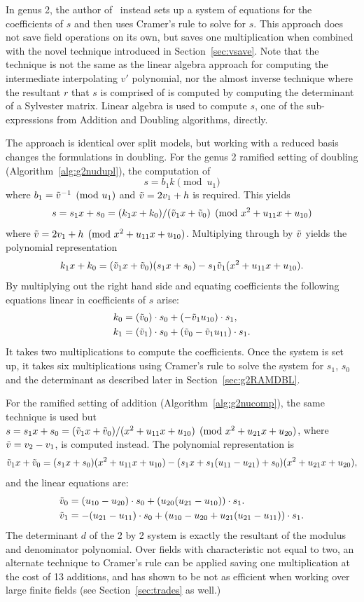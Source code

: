 In genus 2, the author of~\cite{Balamohan_MSc_2009} instead sets up a system of
equations for the coefficients of $s$ and then uses Cramer's rule to solve for
$s$. This approach does not save field operations on its own, but saves one
multiplication when combined with the novel technique introduced in
Section~\ref{sec:vsave}. Note that the
technique is not the same as the linear algebra approach for computing the
intermediate interpolating $v'$ polynomial, nor the almost inverse technique
where the resultant $r$ that $s$ is comprised of is computed by computing the
determinant of a Sylvester matrix. Linear algebra is used to compute $s$, one of
the sub-expressions from Addition and Doubling algorithms, directly.

The approach is identical over split models, but working with a reduced basis
changes the formulations in doubling. For the genus 2 ramified setting of doubling
(Algorithm~\ref{alg:g2nudupl}), the computation of $$s = b_1k \pmod{u_1}$$ where
$b_1 = \tilde{v}^{-1} \pmod{u_1}$ and $\tilde{v} = 2v_1 + h$ is required. This yields $$s =
s_1x + s_0 = (k_1x + k_0)/(\tilde{v}_1x + \tilde{v}_0) \pmod{x^2 + u_{11}x + u_{10}}$$ where
$\tilde{v} = 2v_1 + h \pmod{x^2 + u_{11}x + u_{10}}$. Multiplying through by $\tilde{v}$
yields the polynomial representation $$ k_1x + k_0 = (\tilde{v}_1x + \tilde{v}_0)(s_1x +
s_0) - s_1\tilde{v}_1(x^2 + u_{11}x + u_{10}).$$ By multiplying out the right hand
side and equating coefficients the following equations linear in coefficients of
$s$ arise:  
\begin{align*} k_0 &=
(\tilde{v}_0) \cdot s_0 + (-\tilde{v}_1u_{10}) \cdot s_1, \\
k_1 &= (\tilde{v}_1) \cdot s_0 + (\tilde{v}_0 - \tilde{v}_1u_{11}) \cdot s_1.
\end{align*} 
It takes two multiplications to compute the coefficients. Once the system is set
up, it takes six multiplications using Cramer's rule to solve the system for
$s_1$, $s_0$ and the determinant as described later in Section~\ref{sec:g2RAMDBL}.

For the ramified setting of addition (Algorithm~\ref{alg:g2nucomp}), the same technique
is used but $s = s_1x + s_0 = (\tilde{v}_1x + \tilde{v}_0)/(x^2 + u_{11}x + u_{10})
\pmod{x^2 + u_{21}x + u_{20}}$, where $\tilde{v} = v_2 - v_1$,  is computed instead.
The polynomial representation is
$$\tilde{v}_1x + \tilde{v}_0 = (s_1x + s_0)(x^2 + u_{11}x + u_{10}) - (s_1x + s_1(u_{11}
-u_{21}) + s_0)(x^2 + u_{21}x + u_{20}),$$ and the linear equations are:
\begin{align*} 
    \tilde{v}_0 &= (u_{10} - u_{20}) \cdot s_0 + (u_{20}(u_{21} - u_{10})) \cdot s_1.\\
    \tilde{v}_1 &= -(u_{21}- u_{11}) \cdot s_0 + (u_{10} - u_{20} + u_{21}(u_{21}-u_{11})) \cdot s_1. \\
\end{align*}
The determinant $d$ of the 2 by 2 system is exactly the resultant of the modulus
and denominator polynomial.  Over fields with characteristic not equal to two,
an alternate technique to Cramer's rule can be applied saving one multiplication
at the cost of 13 additions, and has shown to be not as efficient when working
over large finite fields \cite{BosCostelloHisilLauter_fastg2_2013} (see
Section~\ref{sec:trades} as well.)

